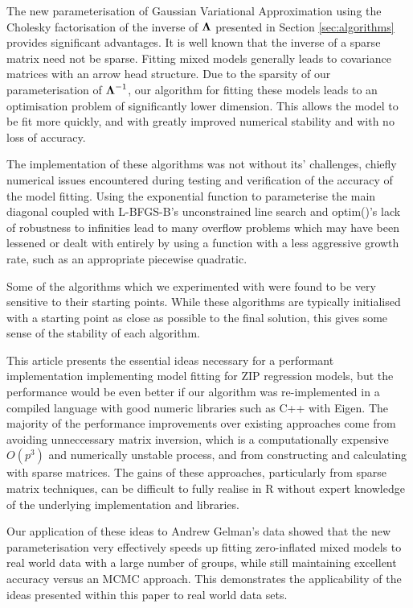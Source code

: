 \documentclass{article}[12pt]
\begin{document}
	\noindent The new parameterisation of Gaussian Variational Approximation using the Cholesky factorisation of the inverse of ${\boldsymbol \Lambda}$ presented in Section \ref{sec:algorithms} provides significant advantages.  It is well known that the inverse of a sparse matrix need not be sparse. Fitting mixed models generally leads to covariance matrices with an arrow head structure. Due to the sparsity of our parameterisation of ${\boldsymbol \Lambda}^{-1}$,  our algorithm for fitting these models leads to an optimisation problem of significantly lower dimension. This allows the model to be fit more quickly, and with greatly improved numerical stability and with no loss of
	accuracy.
	
	\noindent The implementation of these algorithms was not without its' challenges, chiefly numerical issues encountered during testing and verification of the accuracy of the model fitting. Using the exponential function to parameterise the main diagonal coupled with L-BFGS-B's unconstrained line search and optim()'s lack of robustness to infinities lead to many overflow problems which may have been lessened or dealt with entirely by using a function with a less aggressive growth rate, such as an appropriate piecewise quadratic.
	
	Some of the algorithms which we experimented with were found to be very sensitive to their starting points.
	While these algorithms are typically initialised with a starting point as close as possible to the final
	solution, this gives some sense of the stability of each algorithm.
	
	This article presents the essential ideas necessary for a performant implementation implementing model fitting
	for ZIP regression models, but the performance would be even better if our algorithm was re-implemented in a
	compiled language with good numeric libraries such as C++ with Eigen. The majority of the performance
	improvements over existing approaches come from avoiding unneccessary matrix inversion, which is a
	computationally expensive $O(p^3)$ and numerically unstable process, and from constructing and calculating
	with sparse matrices. The gains of these approaches, particularly from sparse matrix techniques, can be
	difficult to fully realise in R without expert knowledge of the underlying implementation and libraries.
	
	Our application of these ideas to Andrew Gelman's data showed that the new parameterisation very effectively
	speeds up fitting zero-inflated mixed models to real world data with a large number of groups, while still
	maintaining excellent accuracy versus an MCMC approach. This demonstrates the applicability of the ideas
	presented within this paper to real world data sets.
	
\end{document}
